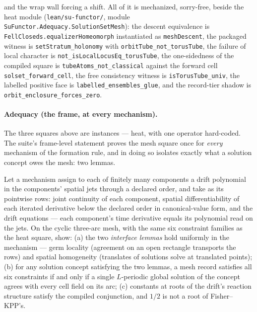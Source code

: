 and the wrap wall forcing a shift.  All of it is mechanized,
sorry-free, beside the heat module (\texttt{lean/su-functor/},
module \texttt{SuFunctor.Adequacy.SolutionSetMesh}): the descent
equivalence is \texttt{FellCloseds.equalizerHomeomorph} instantiated
as \texttt{meshDescent}, the packaged witness is
\texttt{setStratum\_holonomy} with
\texttt{orbitTube\_not\_torusTube}, the failure of local character
is \texttt{not\_isLocalLocusEq\_torusTube}, the one-sidedness of the
compiled square is \texttt{tubeAtoms\_not\_classical} against the
forward cell \texttt{solset\_forward\_cell}, the free consistency
witness is \texttt{isTorusTube\_univ}, the labelled positive face is
\texttt{labelled\_ensembles\_glue}, and the record-tier shadow is
\texttt{orbit\_enclosure\_forces\_zero}.

\paragraph{Adequacy (the frame, at every mechanism).}  The three
squares above are instances --- heat, with one operator hard-coded.
The suite's frame-level statement proves the mesh square once for
\emph{every} mechanism of the formation rule, and in doing so
isolates exactly what a solution concept owes the mesh: two lemmas.

\begin{problem}
\label{prob:mt-pde-frame}
Let a mechanism assign to each of finitely many
components a drift polynomial in the components' spatial jets through
a declared order, and take as its pointwise rows: joint continuity of
each component, spatial differentiability of each iterated derivative
below the declared order in canonical-value form, and the drift
equations --- each component's time derivative equals its polynomial
read on the jets.  On the cyclic three-arc mesh, with the same six
constraint families as the heat square, show: (a) the two
\emph{interface lemmas} hold uniformly in the mechanism --- germ
locality (agreement on an open rectangle transports the rows) and
spatial homogeneity (translates of solutions solve at translated
points); (b) for any solution concept satisfying the two lemmas, a
mesh record satisfies all six constraints if and only if a single
$L$-periodic global solution of the concept agrees with every cell
field on its arc; (c) constants at roots of the drift's reaction
structure satisfy the compiled conjunction, and $1/2$ is not a root
of Fisher--KPP's.
\end{problem}

